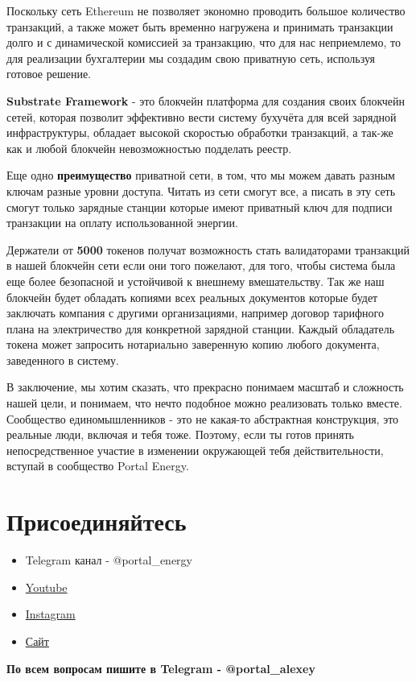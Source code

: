 \documentclass[a4paper,12pt]{report}
\begin{document}
Поскольку сеть Ethereum не позволяет экономно проводить большое количество транзакций, а также может быть временно нагружена и принимать транзакции долго и с динамической комиссией за транзакцию, что для нас неприемлемо, то для реализации бухгалтерии мы создадим свою приватную сеть, используя готовое решение.

\textbf{Substrate Framework} - это блокчейн платформа для создания своих блокчейн сетей, которая позволит эффективно вести систему бухучёта для всей зарядной инфраструктуры, обладает высокой скоростью обработки транзакций, а так-же как и любой блокчейн невозможностью подделать реестр.

Еще одно \textbf{преимущество} приватной сети, в том, что мы можем давать разным ключам разные уровни доступа. Читать из сети смогут все, а писать в эту сеть смогут только зарядные станции которые имеют приватный ключ для подписи транзакции на оплату использованной энергии.

Держатели от \textbf{5000} токенов получат возможность стать валидаторами транзакций в нашей блокчейн сети если они того пожелают, для того, чтобы система была еще более безопасной и устойчивой к внешнему вмешательству. Так же наш блокчейн будет обладать копиями всех реальных документов которые будет заключать компания с другими организациями, например договор тарифного плана на электричество для конкретной зарядной станции.
Каждый обладатель токена может запросить нотариально заверенную копию любого документа, заведенного в систему.

В заключение, мы хотим сказать, что прекрасно понимаем масштаб и сложность нашей цели, и понимаем, что нечто подобное можно реализовать только вместе. Сообщество единомышленников - это не какая-то абстрактная конструкция, это реальные люди, включая и тебя тоже. Поэтому, если ты готов принять непосредственное участие в изменении окружающей тебя действительности, вступай в сообщество Portal Energy.

\section{Присоединяйтесь}

\begin{itemize}
	\item Telegram канал - @portal\_energy
	\item \href{https://www.youtube.com/channel/UCtPxyCkz73i78F9HChlO61w}{Youtube}
	\item \href{https://www.instagram.com/petr_roadrunner/}{Instagram}
	\item \href{https://portalenergy.tech}{Сайт}
\end{itemize}

\textbf{По всем вопросам пишите в Telegram - @portal\_alexey}
\end{document}
